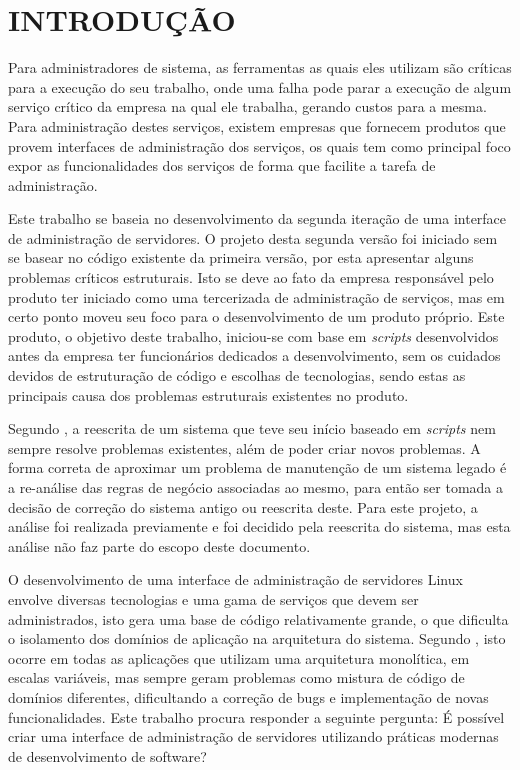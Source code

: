 \chapter{INTRODUÇÃO}
\label{chp:intro}

Para administradores de sistema, as ferramentas as quais eles utilizam são
críticas para a execução do seu trabalho, onde uma falha pode parar a execução
de algum serviço crítico da empresa na qual ele trabalha, gerando custos para
a mesma. Para administração destes serviços, existem empresas que fornecem
produtos que provem interfaces de administração dos serviços, os quais tem
como principal foco expor as funcionalidades dos serviços de forma que
facilite a tarefa de administração.

Este trabalho se baseia no desenvolvimento da segunda iteração de uma
interface de administração de servidores. O projeto desta segunda versão
foi iniciado sem se basear no código existente da primeira versão, por esta
apresentar alguns problemas críticos estruturais. Isto se deve ao fato da
empresa responsável pelo produto ter iniciado como uma tercerizada de
administração de serviços, mas em certo ponto moveu seu foco para o
desenvolvimento de um produto próprio. Este produto, o objetivo deste
trabalho, iniciou-se com base em \emph{scripts} desenvolvidos antes da empresa
ter funcionários dedicados a desenvolvimento, sem os cuidados devidos de
estruturação de código e escolhas de tecnologias, sendo estas as principais
causa dos problemas estruturais existentes no produto.

Segundo , a reescrita de um sistema que teve seu
início baseado em \emph{scripts} nem sempre resolve problemas existentes,
além de poder criar novos problemas. A forma correta de aproximar um problema
de manutenção de um sistema legado é a re-análise das regras de negócio
associadas ao mesmo, para então ser tomada a decisão de correção do sistema
antigo ou reescrita deste. Para este projeto, a análise foi realizada
previamente e foi decidido pela reescrita do sistema, mas esta análise
não faz parte do escopo deste documento.

O desenvolvimento de uma interface de administração de servidores Linux
envolve diversas tecnologias e uma gama de serviços que devem ser
administrados, isto gera uma base de código relativamente grande, o que
dificulta o isolamento dos domínios de aplicação na arquitetura
do sistema. Segundo , isto ocorre em todas as aplicações
que utilizam uma arquitetura monolítica, em escalas variáveis, mas sempre
geram problemas como mistura de código de domínios diferentes, dificultando
a correção de bugs e implementação de novas funcionalidades. Este trabalho
procura responder a seguinte pergunta: É possível criar uma interface de
administração de servidores utilizando práticas modernas de desenvolvimento
de software?

